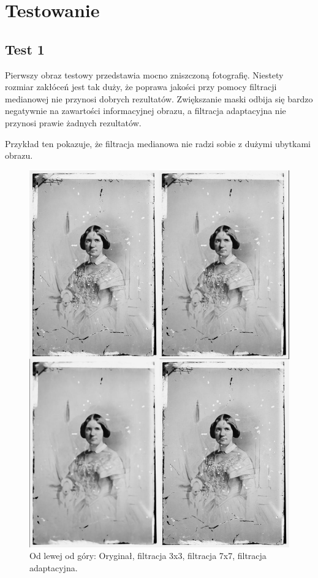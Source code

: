 \documentclass[a4paper,12pt,oneside,notitlepage,onecolumn]{article}
\begin{document}
\section{Testowanie}
\subsection{Test 1}
Pierwszy obraz testowy przedstawia mocno zniszczoną fotografię.
Niestety rozmiar zakłóceń jest tak duży, że poprawa jakości przy pomocy filtracji medianowej nie przynosi dobrych rezultatów.
Zwiększanie maski odbija się bardzo negatywnie na zawartości informacyjnej obrazu, a filtracja adaptacyjna nie przynosi prawie żadnych rezultatów.

Przykład ten pokazuje, że filtracja medianowa nie radzi sobie z dużymi ubytkami obrazu.
\begin{figure}
\centering
\includegraphics[width=13cm]{test1_final.jpg}
\caption{Od lewej od góry: Oryginał, filtracja 3x3, filtracja 7x7, filtracja adaptacyjna.}
\end{figure}
\end{document}
